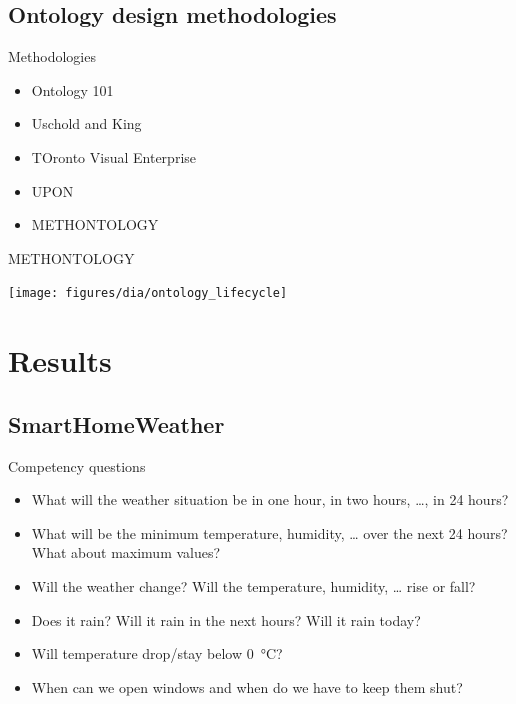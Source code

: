 \documentclass{beamer}
\begin{document}
\subsection{Ontology design methodologies}

\begin{frame}{Methodologies}
	\begin{itemize}
		\item Ontology 101
		\item Uschold and King
		\item TOronto Visual Enterprise
		\item UPON
		\item METHONTOLOGY
	\end{itemize}
\end{frame}

\begin{frame}{METHONTOLOGY}
	\begin{center}
		\texttt{[image: figures/dia/ontology\_lifecycle]}
	\end{center}
\end{frame}

\section{Results}

\subsection{SmartHomeWeather}

\begin{frame}{Competency questions}
	\begin{itemize}
		\item What will the weather situation be in one hour, in two hours, …, in 24 hours?
		\item What will be the minimum temperature, humidity, … over the next 24 hours? What about maximum values?
		\item Will the weather change? Will the temperature, humidity, … rise or fall?
		\item Does it rain? Will it rain in the next hours? Will it rain today?
		\item Will temperature drop/stay below \SI{0}{\celsius}?
		\item When can we open windows and when do we have to keep them shut?
	\end{itemize}
\end{frame}
\end{document}
